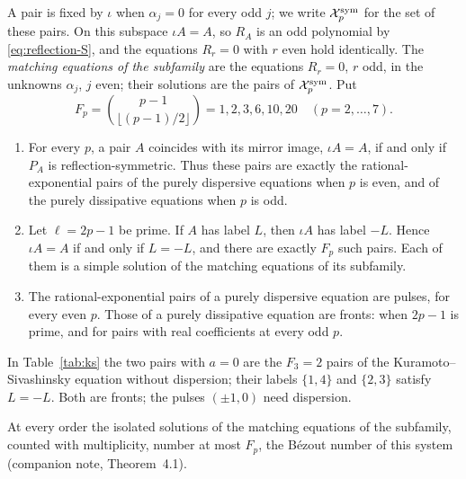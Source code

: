 A pair is fixed by \(\iota\) when \(\alpha_j=0\) for every odd \(j\); we
write \(\mathcal X_p^{\mathrm{sym}}\) for the set of these pairs. On this
subspace \(\iota A=A\), so \(R_A\) is an odd polynomial by
\eqref{eq:reflection-S}, and the equations \(R_r=0\) with \(r\) even
hold identically. The \emph{matching equations of the subfamily} are the
equations \(R_r=0\), \(r\) odd, in the unknowns \(\alpha_j\), \(j\)
even; their solutions are the pairs of \(\mathcal X_p^{\mathrm{sym}}\). Put
\begin{equation}\label{eq:Fp}
 F_p=\binom{p-1}{\lfloor(p-1)/2\rfloor}=1,2,3,6,10,20\quad(p=2,\ldots,7).
\end{equation}

\begin{theorem}\label{thm:symmetric}
\begin{enumerate}
\item[\textup{(i)}] For every \(p\), a pair \(A\) coincides with its
mirror image, \(\iota A=A\), if and only if \(P_A\) is
reflection-symmetric. Thus these pairs are exactly the
rational-exponential pairs of the purely dispersive equations when \(p\)
is even, and of the purely dissipative equations when \(p\) is odd.
\item[\textup{(ii)}] Let \(\ell=2p-1\) be prime. If \(A\) has label
\(L\), then \(\iota A\) has label \(-L\). Hence \(\iota A=A\) if and
only if \(L=-L\), and there are exactly \(F_p\) such pairs. Each of them
is a simple solution of the matching equations of its subfamily.
\item[\textup{(iii)}] The rational-exponential pairs of a purely
dispersive equation are pulses, for every even \(p\). Those of a purely
dissipative equation are fronts: when \(2p-1\) is prime, and for pairs
with real coefficients at every odd \(p\).
\end{enumerate}
\end{theorem}

In Table~\ref{tab:ks} the two pairs with \(a=0\) are the \(F_3=2\) pairs
of the Kuramoto--Sivashinsky equation without dispersion; their labels
\(\{1,4\}\) and \(\{2,3\}\) satisfy \(L=-L\). Both are fronts; the
pulses \((\pm1,0)\) need dispersion.

\begin{remark}\label{rem:Fp-bound}
At every order the isolated solutions of the matching equations of the
subfamily, counted with multiplicity, number at most \(F_p\), the
B\'ezout number of this system (companion note, Theorem~4.1).
\end{remark}

